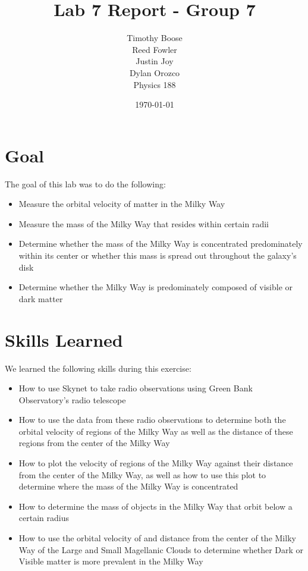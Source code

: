 \documentclass{article}
\author{Timothy Boose\\Reed Fowler\\Justin Joy\\Dylan Orozco\bigskip\\Physics 188}
\date{\today}
\title{Lab 7 Report - Group 7}
\begin{document}
\maketitle

\section{Goal}

The goal of this lab was to do the following:

\begin{itemize}
    \item Measure the orbital velocity of matter in the Milky Way
    \item Measure the mass of the Milky Way that resides within certain radii
    \item Determine whether the mass of the Milky Way is concentrated predominately within its center or whether this mass is spread out throughout the galaxy's disk
    \item Determine whether the Milky Way is predominately composed of visible or dark matter
\end{itemize}

\section{Skills Learned}

We learned the following skills during this exercise:

\begin{itemize}
    \item How to use Skynet to take radio observations using Green Bank Observatory's radio telescope
    \item How to use the data from these radio observations to determine both the orbital velocity of regions of the Milky Way as well as the distance of these regions from the center of the Milky Way
    \item How to plot the velocity of regions of the Milky Way against their distance from the center of the Milky Way, as well as how to use this plot to determine where the mass of the Milky Way is concentrated
    \item How to determine the mass of objects in the Milky Way that orbit below a certain radius
    \item How to use the orbital velocity of and distance from the center of the Milky Way of the Large and Small Magellanic Clouds to determine whether Dark or Visible matter is more prevalent in the Milky Way
\end{itemize}
\end{document}
